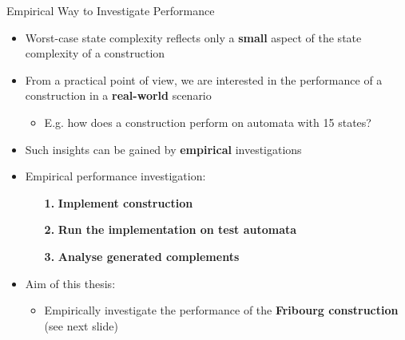 \documentclass[12pt]{beamer}
\newcommand{\fat}[1]{\textbf{#1}}
\begin{document}
\begin{frame}{Empirical Way to Investigate Performance}
\begin{itemize}
\item Worst-case state complexity reflects only a \fat{small} aspect of the state complexity of a construction
\pause
\item From a practical point of view, we are interested in the performance of a construction in a \fat{real-world} scenario
  \begin{itemize}
  \item E.g. how does a construction perform on automata with 15 states?
  \end{itemize}
\pause
\item Such insights can be gained by \fat{empirical} investigations
\item Empirical performance investigation:
  \begin{enumerate}
  \item[\fat{1.}] \fat{Implement construction}
  \item[\fat{2.}] \fat{Run the implementation on test automata}
  \item[\fat{3.}] \fat{Analyse generated complements}
  \end{enumerate}
\pause
\item Aim of this thesis:
  \begin{itemize}
  \item Empirically investigate the performance of the \fat{Fribourg construction} (see next slide)
  \end{itemize}
\end{itemize}
\end{frame}
\end{document}
